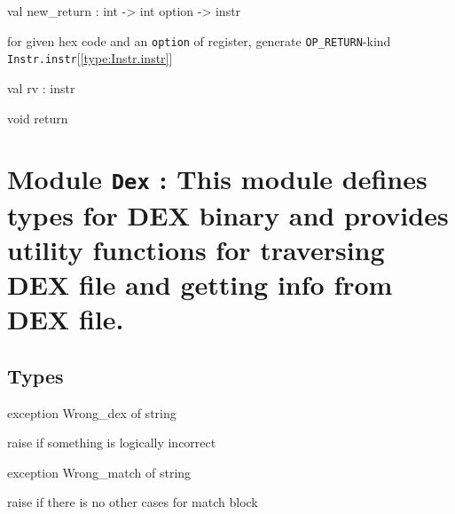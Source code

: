 \documentclass[11pt]{article}
\begin{document}
\label{val:Instr.new-underscorereturn}\begin{ocamldoccode}
val new_return : int -> int option -> instr
\end{ocamldoccode}
\begin{ocamldocdescription}
for given hex code and an {\tt{option}} of register,
 generate {\tt{OP\_RETURN}}-kind {\tt{Instr.instr}}[\ref{type:Instr.instr}]


\end{ocamldocdescription}




\label{val:Instr.rv}\begin{ocamldoccode}
val rv : instr
\end{ocamldoccode}
\begin{ocamldocdescription}
void return


\end{ocamldocdescription}


\section{Module {\tt{Dex}} : This module defines types for DEX binary and provides utility functions
 for traversing DEX file and getting info from DEX file.}
\label{module:Dex}




\ocamldocvspace{0.5cm}



\subsection{Types}




\label{exception:Dex.Wrong-underscoredex}\begin{ocamldoccode}
exception Wrong_dex of string
\end{ocamldoccode}
\begin{ocamldocdescription}
raise if something is logically incorrect


\end{ocamldocdescription}




\label{exception:Dex.Wrong-underscorematch}\begin{ocamldoccode}
exception Wrong_match of string
\end{ocamldoccode}
\begin{ocamldocdescription}
raise if there is no other cases for match block


\end{ocamldocdescription}
\end{document}
